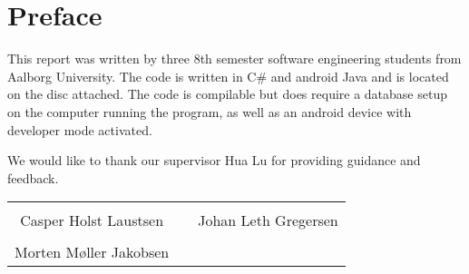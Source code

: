 \thispagestyle{empty}
\section*{Preface}
This report was written by three 8th semester software engineering students from Aalborg University. The code is written in C\# and android Java and is located on the disc attached. The code is compilable but does require a database setup on the computer running the program, as well as an android device with developer mode activated.

\vspace{.2cm}
\noindent We would like to thank our supervisor Hua Lu for providing guidance and feedback.

\begin{table}[H]
	\centering
	\vspace{2cm}
		\begin{tabular}{c c c}
			\underline{\phantom{JAERJAERJAERJAERGO}} & \phantom{cookies} & \underline{\phantom{JAERJAERJAERJAERGO}} \\
			Casper Holst Laustsen & \phantom{cookies} & Johan Leth Gregersen\\[1.5cm]
		    \underline{\phantom{JAERJAERJAERJAERGO}} & \phantom{cookies} & {\phantom{JAERJAERJAERJAERGO}} \\
			Morten Møller Jakobsen & \phantom{cookies} & \\[1.5cm]				
		\end{tabular}
\end{table}
